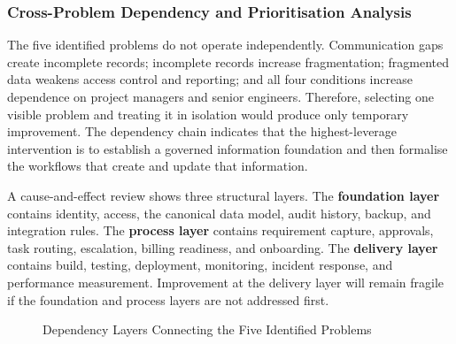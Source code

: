 \documentclass[12pt,a4paper]{report}
\begin{document}
\subsubsection{Cross-Problem Dependency and Prioritisation Analysis}
\label{sec:cross-problem-analysis}

The five identified problems do not operate independently. Communication gaps create incomplete
records; incomplete records increase fragmentation; fragmented data weakens access control and
reporting; and all four conditions increase dependence on project managers and senior engineers.
Therefore, selecting one visible problem and treating it in isolation would produce only temporary
improvement. The dependency chain indicates that the highest-leverage intervention is to establish
a governed information foundation and then formalise the workflows that create and update that
information.

A cause-and-effect review shows three structural layers. The \textbf{foundation layer} contains
identity, access, the canonical data model, audit history, backup, and integration rules. The
\textbf{process layer} contains requirement capture, approvals, task routing, escalation, billing
readiness, and onboarding. The \textbf{delivery layer} contains build, testing, deployment,
monitoring, incident response, and performance measurement. Improvement at the delivery layer
will remain fragile if the foundation and process layers are not addressed first.

\begin{figure}[H]
\centering
{}
\caption{Dependency Layers Connecting the Five Identified Problems}
\label{fig:dependency-layers}
\end{figure}
\end{document}
